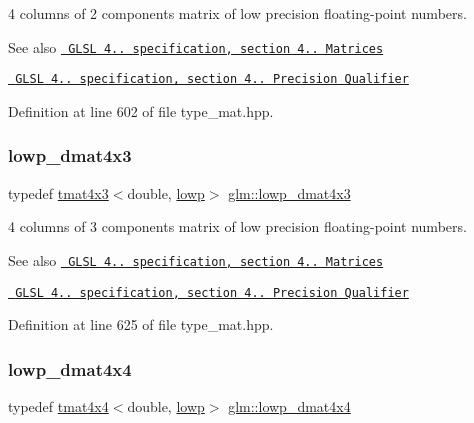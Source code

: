 4 columns of 2 components matrix of low precision floating-\/point numbers.

\begin{DoxySeeAlso}{See also}
\href{http://www.opengl.org/registry/doc/GLSLangSpec.4.20.8.pdf}{\texttt{ G\+L\+SL 4.. specification, section 4.. Matrices}} 

\href{http://www.opengl.org/registry/doc/GLSLangSpec.4.20.8.pdf}{\texttt{ G\+L\+SL 4.. specification, section 4.. Precision Qualifier}} 
\end{DoxySeeAlso}


Definition at line 602 of file type\+\_\+mat.\+hpp.

\mbox{\label{group__core__precision_gac445c564f0c68d3520eca97ea755e618}} 
\subsubsection{\texorpdfstring{lowp\_dmat4x3}{lowp\_dmat4x3}}
{\footnotesize\ttfamily typedef \mbox{\hyperlink{structglm_1_1tmat4x3}{tmat4x3}}$<$double, \mbox{\hyperlink{namespaceglm_a0f04f086094c747d227af4425893f545ae161af3fc695e696ce3bf69f7332bc2d}{lowp}}$>$ \mbox{\hyperlink{group__core__precision_gac445c564f0c68d3520eca97ea755e618}{glm\+::lowp\+\_\+dmat4x3}}}

4 columns of 3 components matrix of low precision floating-\/point numbers.

\begin{DoxySeeAlso}{See also}
\href{http://www.opengl.org/registry/doc/GLSLangSpec.4.20.8.pdf}{\texttt{ G\+L\+SL 4.. specification, section 4.. Matrices}} 

\href{http://www.opengl.org/registry/doc/GLSLangSpec.4.20.8.pdf}{\texttt{ G\+L\+SL 4.. specification, section 4.. Precision Qualifier}} 
\end{DoxySeeAlso}


Definition at line 625 of file type\+\_\+mat.\+hpp.

\mbox{\label{group__core__precision_gad9168c20a21d1bfeb0f5d2ddfb98f519}} 
\subsubsection{\texorpdfstring{lowp\_dmat4x4}{lowp\_dmat4x4}}
{\footnotesize\ttfamily typedef \mbox{\hyperlink{structglm_1_1tmat4x4}{tmat4x4}}$<$double, \mbox{\hyperlink{namespaceglm_a0f04f086094c747d227af4425893f545ae161af3fc695e696ce3bf69f7332bc2d}{lowp}}$>$ \mbox{\hyperlink{group__core__precision_gad9168c20a21d1bfeb0f5d2ddfb98f519}{glm\+::lowp\+\_\+dmat4x4}}}

